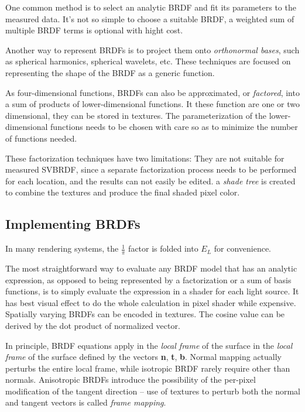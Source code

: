 \documentclass[10pt, a4paper]{article}
\begin{document}
            One common method is to select an analytic BRDF and fit its parameters to the measured data. It's not so simple to choose a suitable BRDF, a weighted sum of multiple BRDF terms is optional with hight cost. 

            Another way to represent BRDFs is to project them onto \emph{orthonormal bases}, such as spherical harmonics, spherical wavelets, etc. These techniques are focused on representing the shape of the BRDF as a generic function. 

            As four-dimensional functions, BRDFs can also be approximated, or \emph{factored}, into a sum of products of lower-dimensional functions. It these function are one or two dimensional, they can be stored in textures. The parameterization of the lower-dimensional functions needs to be chosen with care so as to minimize the number of functions needed. 

            These factorization techniques have two limitations: They are not suitable for measured SVBRDF, since a separate factorization process needs to be performed for each location, and the results can not easily be edited. a \emph{shade tree} is created to combine the textures and produce the final shaded pixel color. 
        
        \subsection{Implementing BRDFs}
            In many rendering systems, the $\frac{1}{\pi}$ factor is folded into $E_L$ for convenience. 
            
            The most straightforward way to evaluate any BRDF model that has an analytic expression, as opposed to being represented by a factorization or a sum of basis functions, is to simply evaluate the expression in a shader for each light source. It has best visual effect to do the whole calculation in pixel shader while expensive. Spatially varying BRDFs can be encoded in textures. The cosine value can be derived by the dot product of normalized vector. 

            In principle, BRDF equations apply in the \emph{local frame} of the surface in the \emph{local frame} of the surface defined by the vectors \textbf{n}, \textbf{t}, \textbf{b}. Normal mapping actually perturbs the entire local frame, while isotropic BRDF rarely require other than normals. Anisotropic BRDFs introduce the possibility of the per-pixel modification of the tangent direction -- use of textures to perturb both the normal and tangent vectors is called \emph{frame mapping}.
\end{document}
